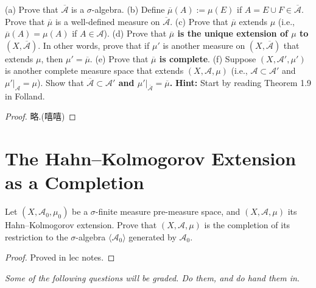 \documentclass[lang=cn,11pt]{elegantbook}
\begin{document}
(a) Prove that \(\overline{\mathcal{A}}\) is a \(\sigma\)-algebra.
(b) Define \(\overline{\mu}(A) := \mu(E)\) if \(A = E \cup F \in \overline{\mathcal{A}}\). Prove that \(\overline{\mu}\) is a well-defined measure on \(\overline{\mathcal{A}}\).
(c) Prove that \(\overline{\mu}\) extends \(\mu\) (i.e., \(\overline{\mu}(A) = \mu(A)\) if \(A \in \mathcal{A}\)).
(d) Prove that\textbf{ \(\overline{\mu}\) is the unique extension of \(\mu\) to \((X, \overline{\mathcal{A}})\)}. In other words, prove that if \(\mu'\) is another measure on \((X, \overline{\mathcal{A}})\) that extends \(\mu\), then \(\mu' = \overline{\mu}\).
(e) Prove that \textbf{\(\overline{\mu}\) is complete}.
(f) Suppose \((X, \mathcal{A}', \mu')\) is another complete measure space that extends \((X, \mathcal{A}, \mu)\) (i.e., \(\mathcal{A} \subset \mathcal{A}'\) and \(\mu'|_{\mathcal{A}} = \mu\)). Show that \textbf{\(\overline{\mathcal{A}} \subset \mathcal{A}'\) and \(\mu'|_{\overline{\mathcal{A}}} = \overline{\mu}\).} 
\textbf{Hint:} Start by reading Theorem 1.9 in Folland.
\begin{proof}
    略.(嘻嘻)
\end{proof}


\section{The Hahn--Kolmogorov Extension as a Completion}
Let \((X, \mathcal{A}_0, \mu_0)\) be a \(\sigma\)-finite measure pre-measure space, and \((X, \mathcal{A}, \mu)\) its Hahn–Kolmogorov extension. Prove that \((X, \mathcal{A}, \mu)\) is the completion of its restriction to the \(\sigma\)-algebra \(\langle \mathcal{A}_0 \rangle\) generated by \(\mathcal{A}_0\).
\begin{proof}
    Proved in lec notes.
\end{proof}



\newpage
\begin{center}
\textit{Some of the following questions will be graded. Do them, and do hand them in}.
\end{center}
\end{document}
